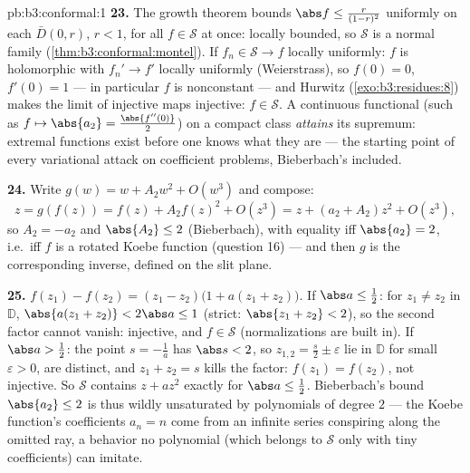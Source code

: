 \begin{solution}{pb:b3:conformal:1}
\textbf{23.} The growth theorem bounds $\abs f \leq
\frac{r}{(1-r)^2}$ uniformly on each $\bar D(0, r)$, $r <
1$, for all $f \in \mathcal S$ at once: locally bounded, so
$\mathcal S$ is a normal family
(\cref{thm:b3:conformal:montel}). If $f_n \in \mathcal S \to
f$ locally uniformly: $f$ is holomorphic with $f_n' \to f'$
locally uniformly (Weierstrass), so $f(0) = 0$, $f'(0) = 1$
--- in particular $f$ is nonconstant --- and Hurwitz
(\cref{exo:b3:residues:8}) makes the limit of injective maps
injective: $f \in \mathcal S$. A continuous functional (such
as $f \mapsto \abs{a_2} = \frac{\abs{f''(0)}}2$) on a
compact class \emph{attains} its supremum: extremal
functions exist before one knows what they are --- the
starting point of every variational attack on coefficient
problems, Bieberbach's included.

\textbf{24.} Write $g(w) = w + A_2w^2 + O(w^3)$ and compose:
\[
z = g(f(z)) = f(z) + A_2f(z)^2 + O(z^3)
= z + (a_2 + A_2)z^2 + O(z^3),
\]
so $A_2 = -a_2$ and $\abs{A_2} \leq 2$ (Bieberbach), with
equality iff $\abs{a_2} = 2$, i.e.\ iff $f$ is a rotated
Koebe function (question 16) --- and then $g$ is the
corresponding inverse, defined on the slit plane.

\textbf{25.} $f(z_1) - f(z_2) = (z_1 - z_2)\bigl(1 + a(z_1 +
z_2)\bigr)$. If $\abs a \leq \frac12$: for $z_1 \neq z_2$ in
$\mathbb D$, $\abs{a(z_1 + z_2)} < 2\abs a \leq 1$ (strict:
$\abs{z_1 + z_2} < 2$), so the second factor cannot vanish:
injective, and $f \in \mathcal S$ (normalizations are
built in). If $\abs a > \frac12$: the point $s =
-\frac1a$ has $\abs s < 2$, so $z_{1,2} = \frac s2 \pm
\varepsilon$ lie in $\mathbb D$ for small $\varepsilon > 0$,
are distinct, and $z_1 + z_2 = s$ kills the factor: $f(z_1)
= f(z_2)$, not injective. So $\mathcal S$ contains $z +
az^2$ exactly for $\abs a \leq \frac12$. Bieberbach's bound
$\abs{a_2} \leq 2$ is thus wildly unsaturated by
polynomials of degree $2$ --- the Koebe function's
coefficients $a_n = n$ come from an infinite series
conspiring along the omitted ray, a behavior no polynomial
(which belongs to $\mathcal S$ only with tiny coefficients)
can imitate.
\end{solution}
